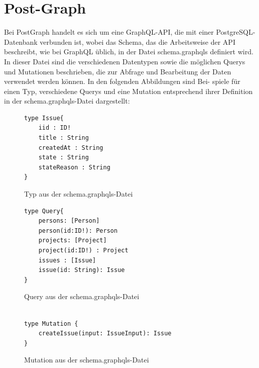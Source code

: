 \section{Post-Graph} %
\label{sec:postgraph}
Bei PostGraph handelt es sich um eine GraphQL-API, die mit einer PostgreSQL-Datenbank verbunden ist, wobei das Schema, das die Arbeitsweise der API beschreibt, wie bei GraphQL üblich, in der Datei schema.graphqls definiert wird. In dieser Datei sind die verschiedenen Datentypen sowie die möglichen Querys und Mutationen beschrieben, die zur Abfrage und Bearbeitung der Daten verwendet werden können. In den folgenden Abbildungen sind Bei- spiele für einen Typ, verschiedene Querys und eine Mutation entsprechend ihrer Definition in der schema.graphqls-Datei dargestellt:
\begin{figure}[H]
\begin{center}
\begin{BVerbatim}
type Issue{
    iid : ID!
    title : String
    createdAt : String
    state : String
    stateReason : String
}
\end{BVerbatim}
\end{center}
\caption{Typ aus der schema.graphqls-Datei}
\end{figure}
\begin{figure}[H]
\begin{center}
\begin{BVerbatim}
type Query{
    persons: [Person]
    person(id:ID!): Person
    projects: [Project]
    project(id:ID!) : Project
    issues : [Issue]
    issue(id: String): Issue
}
\end{BVerbatim}
\end{center}
\caption{Query aus der schema.graphqls-Datei}
\end{figure}
\begin{figure}[H]
\begin{center}
\begin{BVerbatim}

type Mutation {
    createIssue(input: IssueInput): Issue
}
\end{BVerbatim}
\end{center}
\caption{Mutation aus der schema.graphqls-Datei}
\end{figure}
\newpage
\noindent
